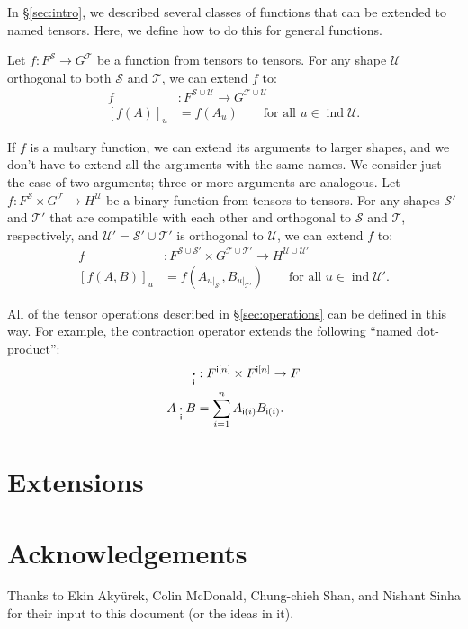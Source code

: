 \documentclass{article}
\DeclareMathOperator{\tupleshape}{ind}
\newcommand{\tuplerestrict}[2]{\left.#1\right|_{#2}}
\begin{document}
In \S\ref{sec:intro}, we described several classes of functions that can be extended to named tensors. Here, we define how to do this for general functions.

Let $f \colon F^{\mathcal{S}} \rightarrow G^{\mathcal{T}}$ be a function from tensors to tensors. For any shape $\mathcal{U}$ orthogonal to both $\mathcal{S}$ and $\mathcal{T}$, we can extend $f$ to:
\begin{align*}
f &: F^{\mathcal{S} \cup \mathcal{U}} \rightarrow G^{\mathcal{T} \cup \mathcal{U}} \\
[f(A)]_u &= f(A_u) \qquad \text{for all $u \in \tupleshape\mathcal{U}$.}
\end{align*}

If $f$ is a multary function, we can extend its arguments to larger shapes, and we don't have to extend all the arguments with the same names. We consider just the case of two arguments; three or more arguments are analogous. Let $f \colon F^{\mathcal{S}} \times G^{\mathcal{T}} \rightarrow H^{\mathcal{U}}$ be a binary function from tensors to tensors. For any shapes $\mathcal{S'}$ and $\mathcal{T'}$ that are compatible with each other and orthogonal to $\mathcal{S}$ and $\mathcal{T}$, respectively, and $\mathcal{U'} = \mathcal{S'} \cup \mathcal{T'}$ is orthogonal to $\mathcal{U}$, we can extend $f$ to:
\begin{align*}
f &: F^{\mathcal{S} \cup \mathcal{S'}} \times G^{\mathcal{T} \cup \mathcal{T'}} \rightarrow H^{\mathcal{U} \cup \mathcal{U'}} \\
  [f(A,B)]_u &= f\left(A_{\tuplerestrict{u}{\mathcal{S'}}},B_{\tuplerestrict{u}{\mathcal{T'}}}\right) \qquad \text{for all $u \in \tupleshape\mathcal{U'}$.}
\end{align*}

All of the tensor operations described in \S\ref{sec:operations} can be defined in this way. For example, the contraction operator extends the following ``named dot-product'':
\begin{align*}
\mathbin{\mathop{\boldsymbol\cdot}\limits_{\mathsf{i}}} &: F^{\mathsf{i}[n]} \times F^{\mathsf{i}[n]} \rightarrow F \\
A \mathbin{\mathop{\boldsymbol\cdot}\limits_{\mathsf{i}}} B &= \sum_{i=1}^n A_{\mathsf{i}(i)} B_{\mathsf{i}(i)}.
\end{align*}

\section{Extensions}





\section*{Acknowledgements}

Thanks to Ekin Aky\"{u}rek, Colin McDonald, Chung-chieh Shan, and Nishant Sinha for their input to this document (or the ideas in it).

\iffalse %
\section*{References}
\fi



\end{document}
